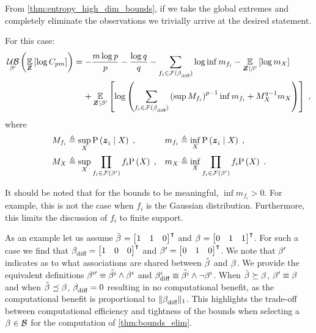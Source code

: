 \begin{proofE}
	From \cref{thm:entropy_high_dim_bounds}, if we take the global extremes and completely eliminate the observations we trivially arrive at the desired statement.

	For this case:
	\begin{equation*}
		\begin{split}
			\upperbound_{\da{}{\prime}}\left(\expectation{\log C_{pm}}{\observationsRV{}}\right)&=-\frac{m\log p}{p}-\frac{\log q}{q}-\sum_{f_i\in\mathcal{F}(\da{\textup{diff}}{})}\log \inf m_{f_i}-\expectation{\log m_{\states{}}}{\observationsRV{}{}\mid\da{}{\prime}}\\
			&\phantomeq+\E_{\observationsRV{}{}\mid\da{}{\prime}}\left[\log\left(\sum_{f_i\in\mathcal{F}(\da{\textup{diff}}{})}\left(\sup M_{f_i}\right)^{p-1}\inf m_{f_i}+M_{\states{}}^{q-1}m_{\states{}}\right)\right]\;,
		\end{split}
	\end{equation*}
	where
	\begin{align*}
		&M_{f_i}\triangleq\sup_{X_{}}\mathrm{P}\left({\boldsymbol z_{i}^{}}\mid{\ensuremath{X_{}}}\right)\;,&&
		m_{f_i}\triangleq\inf_{X_{}}\mathrm{P}\left({\boldsymbol z_{i}^{}}\mid{\ensuremath{X_{}}}\right)\;,
		\\
		&M_{X_{}}\triangleq\sup_{X_{}}\prod_{f_i\in\mathcal{F}(\beta_{}^{\prime})}f_i\mathrm{P}\left({X_{}}\right)\;,&&
		m_{X_{}}\triangleq\inf_{X_{}}\prod_{f_i\in\mathcal{F}(\beta_{}^{\prime})}f_i\mathrm{P}\left({X_{}}\right)\;.
	\end{align*}
\end{proofE}

It should be noted that for the bounds to be meaningful, $\inf m_{f_i}>0$. For example, this is not the case when $f_i$ is the Gaussian distribution. Furthermore, this limits the discussion of $f_i$ to finite support.

As an example let us assume $\tilde{\beta_{}^{}}=\begin{bmatrix}1&1&0\end{bmatrix}^\intercal$ and $\beta_{}^{}=\begin{bmatrix}0&1&1\end{bmatrix}^\intercal$. For such a case we find that $\beta_{\textup{diff}}^{}=\begin{bmatrix}1&0&0\end{bmatrix}^\intercal$ and $\beta_{}^{\prime}=\begin{bmatrix}0&1&0\end{bmatrix}^\intercal$. We note that $\beta_{}^{\prime}$ indicates as to what associations are shared between $\tilde{\beta_{}^{}}$ and $\beta_{}^{}$. We provide the equivalent definitions $\beta_{}^{i\prime}\equiv \tilde{\beta_{}^{i}}\land\beta_{}^{i}$ and $\beta_{\textup{diff}}^{i}\equiv \tilde{\beta_{}^{i}}\land\lnot\beta_{}^{i}$.
When $\tilde{\beta_{}^{}}\succeq\beta_{}^{}$, $\beta_{}^{\prime}\equiv\beta_{}^{}$ and when $\tilde{\beta_{}^{}}\preceq\beta_{}^{}$, $\beta_{\textup{diff}}^{}=0$ resulting in no computational benefit, as the computational benefit is proportional to $\lVert\beta_{\textup{diff}}^{}\rVert_1$. This highlights the trade-off between computational efficiency and tightness of the bounds when selecting a $\beta_{}^{}\in\mathcal B$ for the computation of \cref{thm:bounds_elim}.

